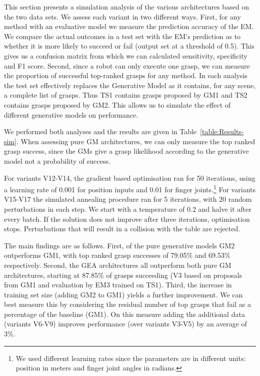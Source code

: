 This section presents a simulation analysis of the various architectures based on the two data sets. 
We assess each variant in two different ways. First, for any method with an evaluative model we  measure the prediction accuracy of the EM. We compare the actual outcomes in a test set with the EM's prediction as to whether it is more likely to succeed or fail (output set at a threshold of 0.5). This gives us a confusion matrix from which we can calculated sensitivity, specificity and F1 score. Second, since a robot can only execute one grasp, we can measure the proportion of successful top-ranked grasps for any method. In each analysis the test set effectively replaces the Generative Model as it contains, for any scene, a complete list of grasps. Thus TS1 contains grasps proposed by GM1 and TS2 contains grasps proposed by GM2. This allows us to simulate the effect of different generative models on performance. 

We performed both analyses and the results are given in Table~\ref{table:Results-sim}. When assessing pure GM architectures, we can only measure the top ranked grasp success, since the GMs give a grasp likelihood according to the generative model not a probability of success. 

For variants V12-V14, the gradient based optimisation ran for 50 iterations, using a learning rate of 0.001 for position inputs and 0.01 for finger joints.\footnote{We used different learning rates since the parameters are in different units: position in meters and finger joint angles in radians.} For variants V15-V17 the simulated annealing procedure ran for 5 iterations, with 20 random perturbations in each step. We start with a temperature of 0.2 and halve it after every batch. If the solution does not improve after three iterations, optimisation stops. Perturbations that will result in a collision with the table are rejected.

The main findings are as follows. First, of the pure generative models GM2 outperforms GM1, with top ranked grasp successes of 79.05\% and 69.53\% respectively. Second, the GEA architectures all outperform both pure GM architectures, starting at 87.85\% of grasps succeeding (V3 based on proposals from GM1 and evaluation by EM3 trained on TS1). Third, the increase in training set size (adding GM2 to GM1) yields a further improvement. We can best measure this by considering the residual number of top grasps that fail as a percentage of the baseline (GM1). On this measure adding the additional data (variants V6-V9) improves performance (over variants V3-V5) by an average of 3\%. 


